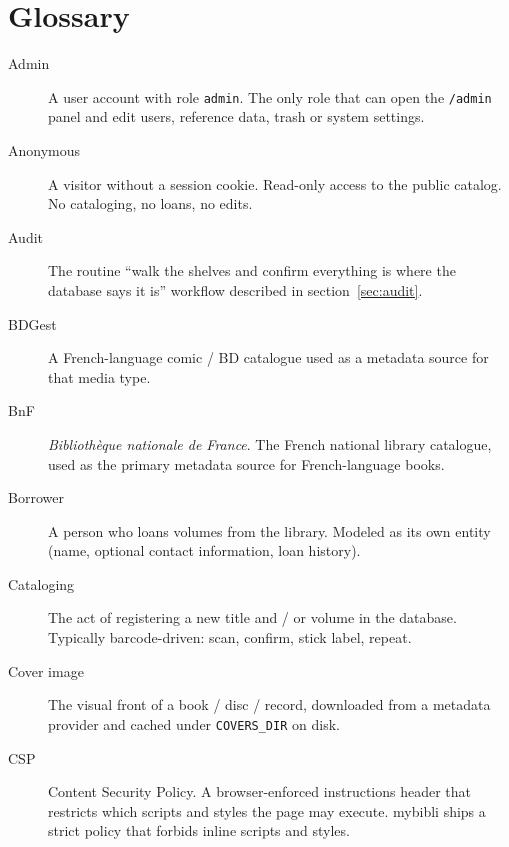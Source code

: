 \chapter{Glossary}
\label{ch:glossary}

\begin{description}

  \item[Admin] A user account with role
        \texttt{admin}. The only role that can open the
        \texttt{/admin} panel and edit users, reference data, trash
        or system settings.

  \item[Anonymous] A visitor without a session
        cookie. Read-only access to the public catalog. No
        cataloging, no loans, no edits.

  \item[Audit] The routine ``walk the shelves and
        confirm everything is where the database says it is''
        workflow described in section~\ref{sec:audit}.

  \item[BDGest] A French-language comic / BD
        catalogue used as a metadata source for that media type.

  \item[BnF] \textit{Bibliothèque nationale de France}.
        The French national library catalogue, used as the primary
        metadata source for French-language books.

  \item[Borrower] A person who loans volumes from
        the library. Modeled as its own entity (name, optional
        contact information, loan history).

  \item[Cataloging] The act of registering a new title and / or
        volume in the database. Typically barcode-driven: scan,
        confirm, stick label, repeat.

  \item[Cover image] The visual front of a book / disc
        / record, downloaded from a metadata provider and cached
        under \texttt{COVERS\_DIR} on disk.

  \item[CSP] Content Security Policy. A browser-enforced
        instructions header that restricts which scripts and styles
        the page may execute. mybibli ships a strict policy that
        forbids inline scripts and styles.


\end{description}

